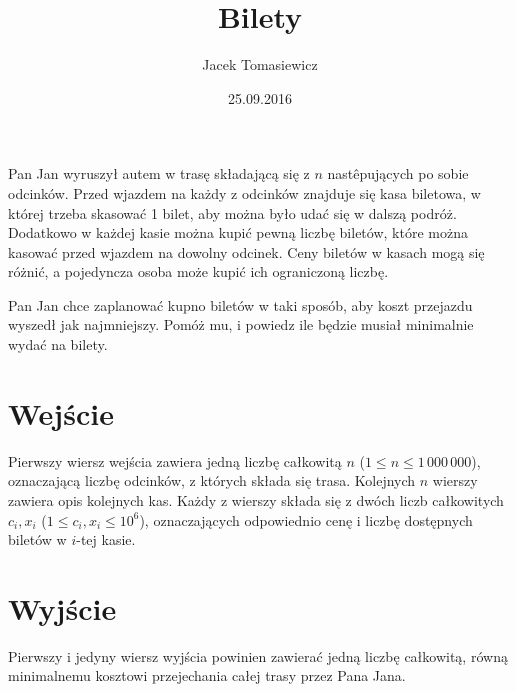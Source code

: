 \documentclass[zad,zawodnik,utf8]{sinol}
\title{Bilety}
\author{Jacek Tomasiewicz} %
\date{25.09.2016}
\begin{document}
  \begin{tasktext}%
Pan Jan wyruszył autem w trasę składającą się z $n$ nastêpujących po sobie odcinków. Przed wjazdem na każdy z odcinków znajduje się kasa biletowa, w której trzeba skasować
1 bilet, aby można było udać się w dalszą podróż. Dodatkowo w każdej kasie można kupić pewną liczbę biletów, które można kasować przed wjazdem na dowolny odcinek. 
Ceny biletów w kasach mogą się różnić, a pojedyncza osoba może kupić ich ograniczoną liczbę. 

Pan Jan chce zaplanować kupno biletów w taki sposób, aby koszt przejazdu wyszedł jak najmniejszy. Pomóż mu, i powiedz ile będzie musiał minimalnie wydać na bilety. 

 \section{Wejście}
    
Pierwszy wiersz wejścia zawiera jedną liczbę całkowitą $n$ ($1 \leq n \leq 1\,000\,000$), oznaczającą liczbę odcinków, z których składa się trasa. Kolejnych $n$ 
wierszy zawiera opis kolejnych kas. Każdy z wierszy składa się z dwóch liczb całkowitych $c_i, x_i$ ($1 \leq c_i, x_i \leq 10^6$), oznaczających odpowiednio cenę i liczbę
dostępnych biletów w $i$-tej kasie. 

  \section{Wyjście}
    Pierwszy i jedyny wiersz wyjścia powinien zawierać jedną liczbę całkowitą, równą minimalnemu kosztowi przejechania całej trasy przez Pana Jana. 
    
    \makecompactexample

  \end{tasktext}
\end{document}
